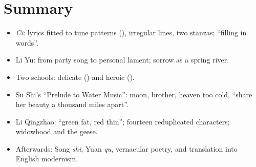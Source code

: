 \section*{Summary}
\begin{itemize}
  \item \emph{Ci}: lyrics fitted to tune patterns (), irregular lines, two stanzas;
        ``filling in words''.
  \item Li Yu: from party song to personal lament; sorrow as a spring river.
  \item Two schools: delicate () and heroic ().
  \item Su Shi's ``Prelude to Water Music'': moon, brother, heaven too cold, ``share her
        beauty a thousand miles apart''.
  \item Li Qingzhao: ``green fat, red thin''; fourteen reduplicated characters; widowhood
        and the geese.
  \item Afterwards: Song \emph{shi}, Yuan \emph{qu}, vernacular poetry, and translation into
        English modernism.
\end{itemize}

